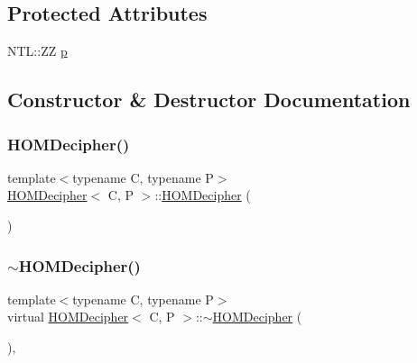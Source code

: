 \subsection*{Protected Attributes}
\begin{DoxyCompactItemize}
\item 
N\+T\+L\+::\+ZZ \hyperlink{classHOMDecipher_a434f26bd73b3f9ee8bf999278d78a26c}{p}
\end{DoxyCompactItemize}


\subsection{Constructor \& Destructor Documentation}
\mbox{\label{classHOMDecipher_ab98e34714b534c4e02d08d952befa62b}} 
\subsubsection{\texorpdfstring{H\+O\+M\+Decipher()}{HOMDecipher()}}
{\footnotesize\ttfamily template$<$typename C, typename P$>$ \\
\hyperlink{classHOMDecipher}{H\+O\+M\+Decipher}$<$ C, P $>$\+::\hyperlink{classHOMDecipher}{H\+O\+M\+Decipher} (\begin{DoxyParamCaption}{ }\end{DoxyParamCaption})\hspace{0.3cm}{\ttfamily [inline]}}

\mbox{\label{classHOMDecipher_ae9f58f01719a48d5bbd41824181e181a}} 
\subsubsection{\texorpdfstring{$\sim$\+H\+O\+M\+Decipher()}{~HOMDecipher()}}
{\footnotesize\ttfamily template$<$typename C, typename P$>$ \\
virtual \hyperlink{classHOMDecipher}{H\+O\+M\+Decipher}$<$ C, P $>$\+::$\sim$\hyperlink{classHOMDecipher}{H\+O\+M\+Decipher} (\begin{DoxyParamCaption}{ }\end{DoxyParamCaption})\hspace{0.3cm}{\ttfamily [inline]}, {\ttfamily [virtual]}}



